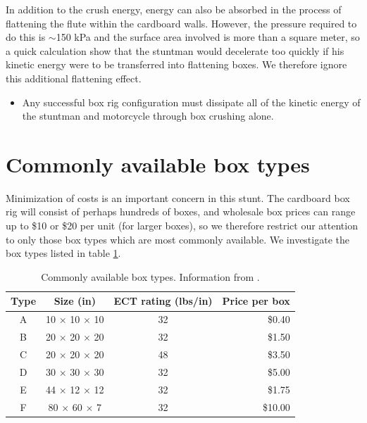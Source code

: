 \documentclass[12pt,a4paper,titlepage]{article}
\begin{document}
In addition to the crush energy, energy can also be absorbed in the process of flattening
the flute within the cardboard walls.  However, the pressure required to do this is
$\sim$150 kPa \cite{flutes} and the surface area involved is more than a square meter,
so a quick calculation show that the stuntman would decelerate too quickly if his kinetic
energy were to be transferred into flattening boxes.  We therefore ignore this additional flattening effect.
\begin{itemize}
\item Any successful box rig configuration must dissipate all of the kinetic energy of the stuntman and motorcycle through box crushing alone.
\end{itemize}

\section{Commonly available box types}

Minimization of costs is an important concern in this stunt.  The cardboard box rig will consist
of perhaps hundreds of boxes, and wholesale box prices can range up to \$10 or \$20 per unit (for larger
boxes), so we therefore restrict our attention to only those box types which are most commonly available.
We investigate the box types listed in table \ref{boxtypes}.

\begin{table}
\caption{\label{boxtypes} Commonly available box types. Information from \cite{papermart, veripack}.}
\begin{center}
\begin{tabular}{c |c | c | r} \\
Type &  Size (in) & ECT rating (lbs/in) & Price per box \\ \hline \hline
A & 10 $\times$ 10 $\times$ 10 & 32 & \$0.40 \\
B & 20 $\times$ 20 $\times$ 20 & 32 & \$1.50 \\
C & 20 $\times$ 20 $\times$ 20 & 48 & \$3.50 \\
D & 30 $\times$ 30 $\times$ 30 & 32 & \$5.00 \\
E & 44 $\times$ 12 $\times$ 12 & 32 & \$1.75 \\
F & 80 $\times$ 60 $\times$ 7  & 32 & \$10.00 \\
\end{tabular}
\end{center}
\end{table}
\end{document}
